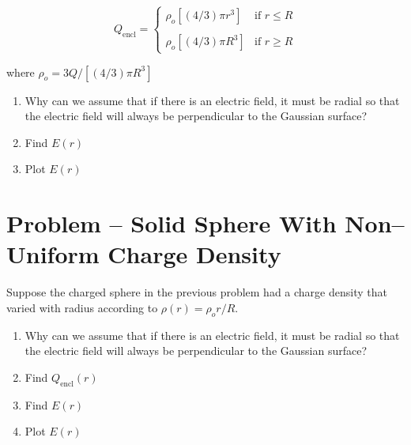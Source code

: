 \documentclass{article}
\newcommand{\ds}[0]{\displaystyle}
\begin{document}


$$
Q_{\text{encl}} = \begin{cases}
  \rho_o [(4/3)\pi r^3]   &\text{if  }r \le R \\\\
  \rho_o [(4/3)\pi R^3] &\text{if } r \ge R
\end{cases}
$$

where $\ds \rho_o=3Q/[(4/3)\pi R^3]$

\begin{enumerate}

  \item Why can we assume that if there is an electric field, it must be radial so that the electric field will always be perpendicular to the Gaussian surface?

        \ifsolutions

        \else
        \vskip 96pt
        \fi

  \item Find $E(r)$

        \ifsolutions

        \else
        \vskip 96pt
        \fi

  \item Plot $E(r)$

        \ifsolutions

        \else
        \vskip 96pt
        \fi

\end{enumerate}

\newpage

\section{Problem -- Solid Sphere With Non--Uniform Charge Density}

Suppose the charged sphere in the previous problem had a charge density that varied with radius according to $\rho(r) = \rho_o r/R$.

\begin{enumerate}

  \item Why can we assume that if there is an electric field, it must be radial so that the electric field will always be perpendicular to the Gaussian surface?

        \ifsolutions

        \else
        \vskip 96pt
        \fi

  \item Find $Q_{\text{encl}}(r)$

        \ifsolutions

        \else
        \vskip 144pt
        \fi

  \item Find $E(r)$

        \ifsolutions

        \else
        \vskip 144pt
        \fi

  \item Plot $E(r)$

\end{enumerate}
\end{document}
